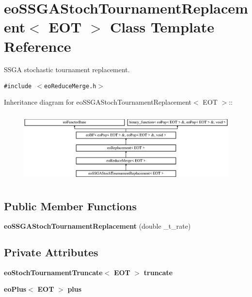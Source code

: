 \section{eo\-SSGAStoch\-Tournament\-Replacement$<$ EOT $>$ Class Template Reference}
\label{classeo_s_s_g_a_stoch_tournament_replacement}
SSGA stochastic tournament replacement.  


{\tt \#include $<$eo\-Reduce\-Merge.h$>$}

Inheritance diagram for eo\-SSGAStoch\-Tournament\-Replacement$<$ EOT $>$::\begin{figure}[H]
\begin{center}
\leavevmode
\includegraphics[height=3.76344cm]{classeo_s_s_g_a_stoch_tournament_replacement}
\end{center}
\end{figure}
\subsection*{Public Member Functions}
\begin{CompactItemize}
\item 
{\bf eo\-SSGAStoch\-Tournament\-Replacement} (double \_\-t\_\-rate)\label{classeo_s_s_g_a_stoch_tournament_replacement_a0}

\end{CompactItemize}
\subsection*{Private Attributes}
\begin{CompactItemize}
\item 
{\bf eo\-Stoch\-Tournament\-Truncate}$<$ {\bf EOT} $>$ {\bf truncate}\label{classeo_s_s_g_a_stoch_tournament_replacement_r0}

\item 
{\bf eo\-Plus}$<$ {\bf EOT} $>$ {\bf plus}\label{classeo_s_s_g_a_stoch_tournament_replacement_r1}

\end{CompactItemize}



